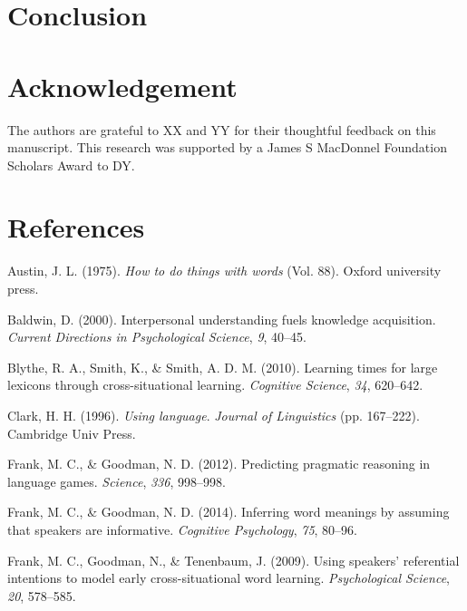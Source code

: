 \documentclass[english,,man,floatsintext]{apa6}
\begin{document}
\hypertarget{conclusion}{%
\section{Conclusion}\label{conclusion}}

\hypertarget{acknowledgement}{%
\section{Acknowledgement}\label{acknowledgement}}

The authors are grateful to XX and YY for their thoughtful feedback on this manuscript. This research was supported by a James S MacDonnel Foundation Scholars Award to DY.

\newpage

\hypertarget{references}{%
\section{References}\label{references}}

\setlength{\parindent}{-0.5in}
\setlength{\leftskip}{0.5in}

\hypertarget{refs}{}
\leavevmode\hypertarget{ref-austin1975}{}%
Austin, J. L. (1975). \emph{How to do things with words} (Vol. 88). Oxford university press.

\leavevmode\hypertarget{ref-baldwin2000}{}%
Baldwin, D. (2000). Interpersonal understanding fuels knowledge acquisition. \emph{Current Directions in Psychological Science}, \emph{9}, 40--45.

\leavevmode\hypertarget{ref-blythe2010}{}%
Blythe, R. A., Smith, K., \& Smith, A. D. M. (2010). Learning times for large lexicons through cross-situational learning. \emph{Cognitive Science}, \emph{34}, 620--642.

\leavevmode\hypertarget{ref-clark1996}{}%
Clark, H. H. (1996). \emph{Using language}. \emph{Journal of Linguistics} (pp. 167--222). Cambridge Univ Press.

\leavevmode\hypertarget{ref-frank2012}{}%
Frank, M. C., \& Goodman, N. D. (2012). Predicting pragmatic reasoning in language games. \emph{Science}, \emph{336}, 998--998.

\leavevmode\hypertarget{ref-frank2014}{}%
Frank, M. C., \& Goodman, N. D. (2014). Inferring word meanings by assuming that speakers are informative. \emph{Cognitive Psychology}, \emph{75}, 80--96.

\leavevmode\hypertarget{ref-frank2009}{}%
Frank, M. C., Goodman, N., \& Tenenbaum, J. (2009). Using speakers' referential intentions to model early cross-situational word learning. \emph{Psychological Science}, \emph{20}, 578--585.
\end{document}
